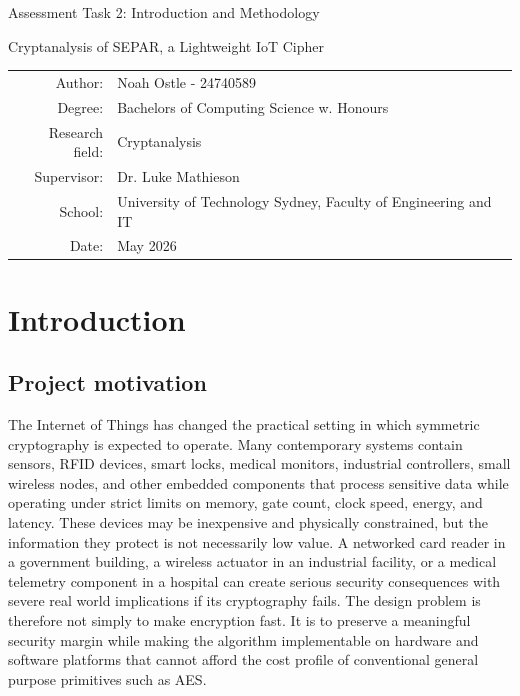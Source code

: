 \documentclass[11pt]{article}
\begin{document}
\begin{titlepage}
\centering
\vspace*{2cm}
{\Large Assessment Task 2: Introduction and Methodology \par}
\vspace{1.2cm}
{\huge Cryptanalysis of SEPAR, a Lightweight IoT Cipher\par}
\vspace{2cm}
\begin{tabular}{rl}
Author: & Noah Ostle - 24740589 \\
Degree: & Bachelors of Computing Science w. Honours \\
Research field: & Cryptanalysis \\
Supervisor: & Dr. Luke Mathieson \\
School: & University of Technology Sydney, Faculty of Engineering and IT \\
Date: & May 2026 \\
\end{tabular}
\vfill
\end{titlepage}

\tableofcontents
\newpage

\section{Introduction}

\subsection{Project motivation}

The Internet of Things has changed the practical setting in which symmetric cryptography is expected to operate. Many contemporary systems contain sensors, RFID devices, smart locks, medical monitors, industrial controllers, small wireless nodes, and other embedded components that process sensitive data while operating under strict limits on memory, gate count, clock speed, energy, and latency. These devices may be inexpensive and physically constrained, but the information they protect is not necessarily low value. A networked card reader in a government building, a wireless actuator in an industrial facility, or a medical telemetry component in a hospital can create serious security consequences with severe real world implications if its cryptography fails. The design problem is therefore not simply to make encryption fast. It is to preserve a meaningful security margin while making the algorithm implementable on hardware and software platforms that cannot afford the cost profile of conventional general purpose primitives such as AES.\\
\end{document}
